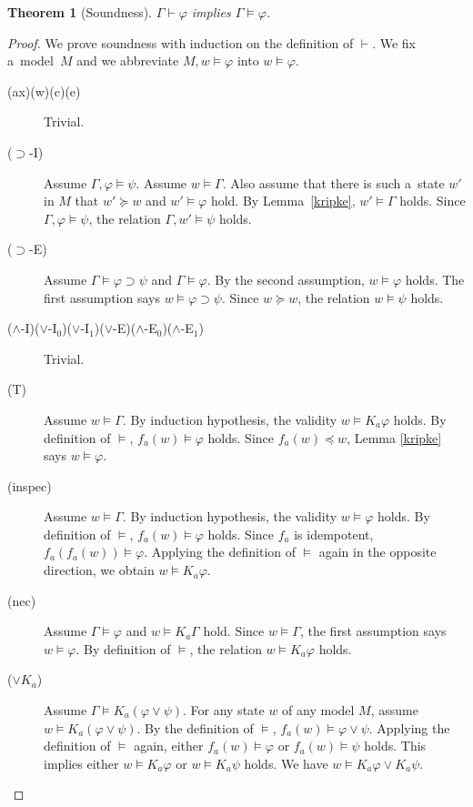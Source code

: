 \documentclass[doctor]{iscs-thesis}
\newtheorem{theorem}{Theorem}
\begin{document}
\begin{theorem}[Soundness]
\label{soundness}
$\Gamma\vdash\varphi$ implies $\Gamma\models\varphi$.
\end{theorem}
\begin{proof}
We prove soundness with induction on the definition of $\vdash$. 
 We fix a~model~$M$ and we abbreviate $M,w \models
 \varphi$ into $w\models \varphi$.
\begin{description}
 \item[(ax)(w)(c)(e)] Trivial.
 \item[($\supset$-I)] Assume $\Gamma,\varphi\models\psi$.
	    Assume $w\models \Gamma$. Also assume that there is such a~state $w'$
	    in $M$ that $w'\succeq w$ and
	    $w'\models\varphi$ hold. 
	    By Lemma~\ref{kripke}, $ w'\models\Gamma$ holds.
	    Since $\Gamma,\varphi\models\psi$, the relation $\Gamma, w'\models
	    \psi$ holds.
 \item[($\supset$-E)]
	    Assume $\Gamma\models\varphi\supset\psi$ and $\Gamma\models\varphi$.
	    By the second assumption, $w\models \varphi$ holds.
	    The first assumption says $w\models\varphi\supset\psi$.
	    Since $w\succeq w$, the relation $w\models\psi$ holds.
 \item[($\wedge$-I)($\vee$-I$_0$)($\vee$-I$_1$)($\vee$-E)($\wedge$-E$_0$)($\wedge$-E$_1$)]
	    Trivial.
 \item[(T)] Assume $w\models \Gamma$. By induction hypothesis,
	    the validity $w\models K_a \varphi$ holds.
	    By definition of $\models$, 
	    $ f_a(w)\models\varphi$ holds.
	    Since $f_a(w)\preceq w$, Lemma \ref{kripke} says
	    $w\models \varphi$.
 \item[(inspec)]
	    Assume $w\models \Gamma$.
	    By induction hypothesis, the validity
	    $w\models\varphi$ holds. By definition of $\models$,
	    $f_a(w)\models\varphi$ holds.
	    Since $f_a$ is idempotent, 
	    $f_a(f_a(w))\models\varphi$.
	    Applying the definition of $\models$ again in the opposite direction,
	    we obtain
	    $w\models{K_a}\varphi$.
 \item[(nec)] 
	    Assume $\Gamma\models\varphi$ and
	    $ w\models{K_a}\Gamma$ hold.
	    Since $w\models\Gamma$, the first assumption says $w\models \varphi$.
	    By definition of $\models$, the relation
	    $w\models{K_a} \varphi$ holds.
 \item[($\vee{K_a}$)]
	    Assume $\Gamma\models {K_a}(\varphi\vee\psi)$.
	    For any state $w$ of any model $M$, assume
	    $w\models{K_a}(\varphi\vee\psi)$.
	    By the definition of $\models$,
	    $f_a(w)\models\varphi\vee\psi$.
	    Applying the definition of $\models$ again,
	    either $f_a(w)\models\varphi$ or $f_a(w)\models\psi$ holds.
	    This implies either $w\models{K_a}\varphi$ or $w\models{K_a}\psi$
	    holds.
	    We have $w\models{K_a}\varphi\vee{K_a}\psi$. 
\end{description}
\end{proof}
\end{document}
